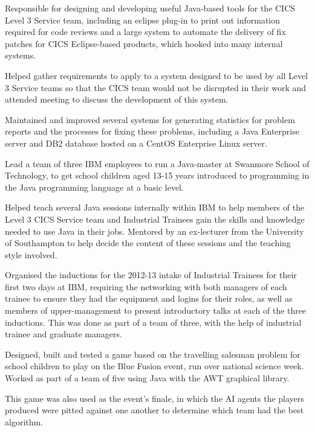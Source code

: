 \documentclass[letterpaper,11pt]{article}
\begin{document}
Responsible for designing and developing useful Java-based tools for the CICS 
Level 3 Service team, including an eclipse plug-in to print out information 
required for code reviews and a large system to automate the delivery of fix 
patches for CICS Eclipse-based products, which hooked into many internal 
systems.

Helped gather requirements to apply to a system designed to be used by all 
Level 3 Service teams so that the CICS team would not be disrupted in their 
work and attended meeting to discuss the development of this system.

Maintained and improved several systems for generating statistics for problem 
reports and the processes for fixing these problems, including a Java 
Enterprise server and DB2 database hosted on a CentOS Enterprise Linux server.

Lead a team of three IBM employees to run a Java-master at Swanmore School of 
Technology, to get school children aged 13-15 years introduced to programming 
in the Java programming language at a basic level.

Helped teach several Java sessions internally within IBM to help members of the
Level 3 CICS Service team and Industrial Trainees gain the skills and knowledge
needed to use Java in their jobs. Mentored by an ex-lecturer from the 
University of Southampton to help decide the content of these sessions and the 
teaching style involved.

Organised the inductions for the 2012-13 intake of Industrial Trainees for 
their first two days at IBM, requiring the networking with both managers of 
each trainee to ensure they had the equipment and logins for their roles, as 
well as members of upper-management to present introductory talks at each of 
the three inductions. This was done as part of a team of three, with the help 
of industrial trainee and graduate managers.

Designed, built and tested a game based on the travelling salesman problem for
school children to play on the Blue Fusion event, run over national science 
week. Worked as part of a team of five using Java with the AWT graphical 
library.

This game was also used as the event's finale, in which the AI agents the 
players produced were pitted against one another to determine which team had the
best algorithm.
\end{document}
